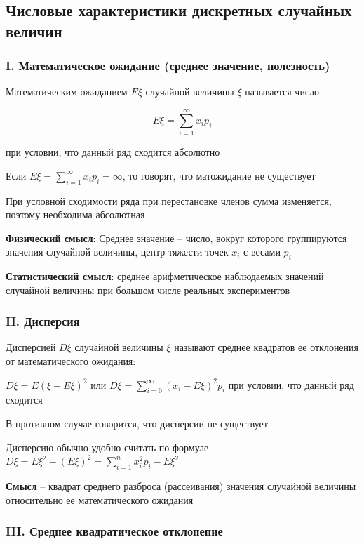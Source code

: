 \documentclass[12pt]{article}
\begin{document}
    \subsection{Числовые характеристики дискретных случайных величин}

    \subsubsection{I. Математическое ожидание (среднее значение, полезность)}

    \Defs Математическим ожиданием $E\xi$ случайной величины $\xi$ называется число

    \[ E\xi = \sum_{i = 1}^\infty x_i p_i \]

    при условии, что данный ряд сходится абсолютно

    \Nota Если $E\xi = \sum_{i = 1}^\infty x_i p_i = \infty$, то говорят, что матожидание не существует

    При условной сходимости ряда при перестановке членов сумма изменяется, поэтому необходима абсолютная

    \textbf{Физический смысл}: Среднее значение -- число, вокруг которого группируются значения случайной величины, центр тяжести точек $x_i$ с весами $p_i$

    \textbf{Статистический смысл}: среднее арифметическое наблюдаемых значений случайной величины при
    большом числе реальных экспериментов

    \subsubsection{II. Дисперсия}

    \Defs Дисперсией $D\xi$ случайной величины $\xi$ называют среднее квадратов ее отклонения от математического ожидания:

    $D\xi = E (\xi - E\xi)^2$ или $D\xi = \sum_{i = 0}^\infty (x_i - E\xi)^2 p_i$ при условии, что данный ряд сходится

    В противном случае говорится, что дисперсии не существует

    \Nota Дисперсию обычно удобно считать по формуле $D\xi = E\xi^2 - (E\xi)^2 = \sum_{i = 1}^n x^2_i p_i - E\xi^2$

    \textbf{Смысл} -- квадрат среднего разброса (рассеивания) значения случайной величины относительно ее математического
    ожидания

    \subsubsection{III. Среднее квадратическое отклонение}
\end{document}
